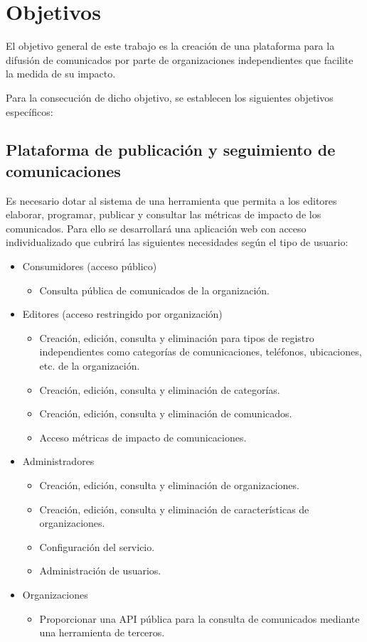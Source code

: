 \section{Objetivos}
El objetivo general de este trabajo es la creación de una plataforma para la difusión de comunicados por parte de organizaciones independientes que facilite la medida de su impacto.

Para la consecución de dicho objetivo, se establecen los siguientes objetivos específicos:

\subsection{Plataforma de publicación y seguimiento de comunicaciones}
Es necesario dotar al sistema de una herramienta que permita a los editores elaborar, programar, publicar y consultar las métricas de impacto de los comunicados. Para ello se desarrollará una aplicación web con acceso individualizado que cubrirá las siguientes necesidades según el tipo de usuario:
\begin{itemize}
    \item Consumidores (acceso público)
    \begin{itemize}
        \item Consulta pública de comunicados de la organización.
    \end{itemize}
    \item Editores (acceso restringido por organización)
    \begin{itemize}
        \item Creación, edición, consulta y eliminación para tipos de registro independientes como categorías de comunicaciones, teléfonos, ubicaciones, etc. de la organización.
        \item Creación, edición, consulta y eliminación de categorías.
        \item Creación, edición, consulta y eliminación de comunicados.
        \item Acceso métricas de impacto de comunicaciones.
    \end{itemize}
    \item Administradores
    \begin{itemize}
        \item Creación, edición, consulta y eliminación de organizaciones.
        \item Creación, edición, consulta y eliminación de características de organizaciones.
        \item Configuración del servicio.
        \item Administración de usuarios.
    \end{itemize}
    \item Organizaciones
    \begin{itemize}
        \item Proporcionar una API pública para la consulta de comunicados mediante una herramienta de terceros.
    \end{itemize}
\end{itemize}

